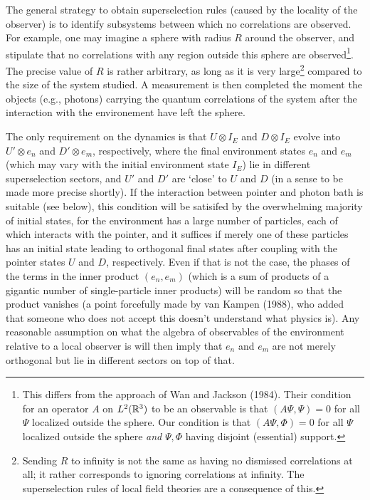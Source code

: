 \documentclass[12pt,titlepage]{article}
\newcommand{\fn}{\footnote}
\newcommand{\ot}{\otimes}
\begin{document}
The general strategy to obtain superselection rules (caused by the locality of
the observer) is to
identify subsystems between which no correlations are observed. For example,
one may imagine a
sphere with radius $R$ around the observer, and stipulate that no correlations
with
any region outside this sphere are observed\fn{This differs from the approach
of Wan and Jackson
(1984). Their condition for an operator $A$ on $L^2({\Bbb R}^3)$ to be an
observable is that
$(A\Psi,\Psi)=0$ for all $\Psi$ localized outside the sphere. Our condition is
that
$(A\Psi,\Phi)=0$ for all $\Psi$ localized outside the sphere {\em and}
$\Psi,\Phi$ having disjoint
(essential)  support.}. The precise value of $R$ is rather arbitrary, as long
as it is  very large\fn{
Sending $R$ to infinity is not the same as having no dismissed correlations at
all; it rather
corresponds to ignoring correlations at infinity. The superselection rules of
local field theories
are a consequence of this.} compared to the size of the system studied. A
measurement is then
completed the moment the objects (e.g., photons) carrying the quantum
correlations of the system
after the interaction with the environement have left the sphere.

The only requirement on the dynamics is that $U\ot I_E$ and $D \ot I_E$ evolve
into $U'\ot e_n$ and
$D'\ot e_m$, respectively, where the  final environment states $e_n$ and $e_m$
(which may vary with
the initial environment state
$I_E$) lie in different superselection sectors, and $U'$  and $D'$ are `close'
to $U$ and $D$ (in a
sense to be made more precise shortly). If the interaction between pointer and
photon bath is
suitable (see below), this  condition will be satisifed by the overwhelming
majority of initial
states, for the environment has a large number of particles, each of which
interacts with the
pointer, and it suffices if merely one of these particles has an initial state
leading to orthogonal
final states after coupling with the pointer states $U$ and $D$, respectively.
 Even if that is not the case, the phases of the terms in the inner
product $(e_n,e_m)$ (which is a sum of products of a gigantic number of
single-particle inner
products) will be random so that the product vanishes (a point forcefully made
by van Kampen (1988),
who added that someone who does not accept this doesn't understand what physics
is).
Any reasonable assumption on what the   algebra of observables of the
environment relative to a
local observer is will then imply that $e_n$ and $e_m$ are not merely
orthogonal but lie in
different sectors on top of that.
\end{document}
